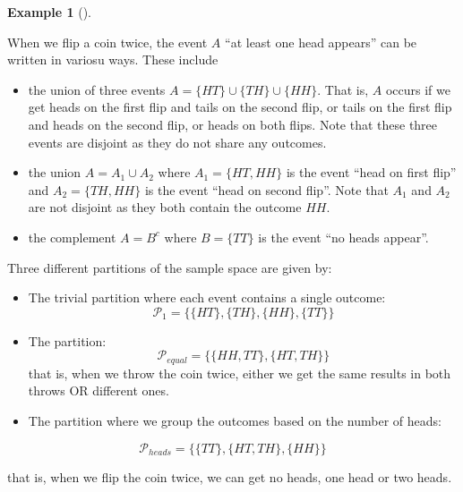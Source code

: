\documentclass[
  letterpaper,
]{scrbook}
\theoremstyle{definition}
\theoremstyle{plain}
\theoremstyle{plain}
\theoremstyle{definition}
\newtheorem{example}{Example}[chapter]
\theoremstyle{remark}
\begin{document}
\begin{tcolorbox}[enhanced jigsaw, bottomtitle=1mm, coltitle=black, toprule=.15mm, toptitle=1mm, bottomrule=.15mm, colback=white, arc=.35mm, opacityback=0, breakable, title={Representation of events using set operations}, titlerule=0mm, rightrule=.15mm, colbacktitle=quarto-callout-note-color!10!white, colframe=quarto-callout-note-color-frame, opacitybacktitle=0.6, leftrule=.75mm, left=2mm]

\begin{example}[]\protect\hypertarget{exm-union}{}\label{exm-union}

When we flip a coin twice, the event \(A\) ``at least one head appears''
can be written in variosu ways. These include

\begin{itemize}
\item
  the union of three events \(A = \{HT\} \cup \{TH\} \cup \{HH\}\). That
  is, \(A\) occurs if we get heads on the first flip and tails on the
  second flip, or tails on the first flip and heads on the second flip,
  or heads on both flips. Note that these three events are disjoint as
  they do not share any outcomes.
\item
  the union \(A = A_1 \cup A_2\) where \(A_1 = \{HT, HH\}\) is the event
  ``head on first flip'' and \(A_2 = \{TH, HH\}\) is the event ``head on
  second flip''. Note that \(A_1\) and \(A_2\) are not disjoint as they
  both contain the outcome \(HH\).
\item
  the complement \(A = B^c\) where \(B = \{TT\}\) is the event ``no
  heads appear''.
\end{itemize}

Three different partitions of the sample space are given by:

\begin{itemize}
\item
  The trivial partition where each event contains a single outcome: \[
  \mathcal P_1=\{\{HT\},\{TH\},\{HH\},\{TT\}\}
  \]
\item
  The partition: \[
  \mathcal P_{equal}=\{\{HH,TT\}, \{HT,TH\}\}
  \] that is, when we throw the coin twice, either we get the same
  results in both throws OR different ones.
\item
  The partition where we group the outcomes based on the number of
  heads:
\end{itemize}

\[
\mathcal P_{heads} =\{\{TT\}, \{HT,TH\}, \{HH\}\}
\]

that is, when we flip the coin twice, we can get no heads, one head or
two heads.

\end{example}

\end{tcolorbox}
\end{document}
